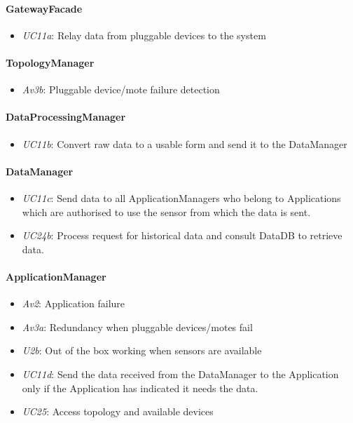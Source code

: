 \documentclass[english]{sareport}
\begin{document}
\paragraph{GatewayFacade}
\begin{itemize}
	\item \emph{UC11a}: Relay data from pluggable devices to the system
\end{itemize}

\paragraph{TopologyManager}
\begin{itemize}
	\item \emph{Av3b}: Pluggable device/mote failure detection
\end{itemize}

\paragraph{DataProcessingManager}
\begin{itemize}
	\item \emph{UC11b}: Convert raw data to a usable form and send it to the DataManager
\end{itemize}

\paragraph{DataManager}
\begin{itemize}
	\item \emph{UC11c}: Send data to all ApplicationManagers who belong to Applications which are authorised to use the sensor from which the data is sent.
	\item \emph{UC24b}: Process request for historical data and consult DataDB to retrieve data.
\end{itemize}

\paragraph{ApplicationManager}
\begin{itemize}
	\item \emph{Av2}: Application failure
	\item \emph{Av3a}: Redundancy when pluggable devices/motes fail
	\item \emph{U2b}: Out of the box working when sensors are available
	\item \emph{UC11d}: Send the data received from the DataManager to the Application only if the Application has indicated it needs the data.
	\item \emph{UC25}: Access topology and available devices
\end{itemize}
\end{document}
